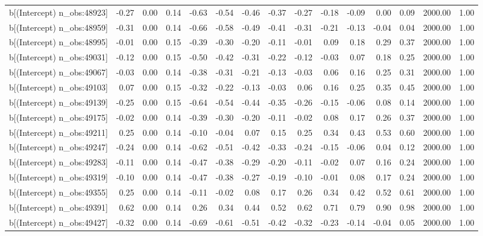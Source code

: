 \begin{table}[ht]
\begin{tabular}{rrrrrrrrrrrrrrr}
  b[(Intercept) n\_obs:48923] & -0.27 & 0.00 & 0.14 & -0.63 & -0.54 & -0.46 & -0.37 & -0.27 & -0.18 & -0.09 & 0.00 & 0.09 & 2000.00 & 1.00 \\ 
  b[(Intercept) n\_obs:48959] & -0.31 & 0.00 & 0.14 & -0.66 & -0.58 & -0.49 & -0.41 & -0.31 & -0.21 & -0.13 & -0.04 & 0.04 & 2000.00 & 1.00 \\ 
  b[(Intercept) n\_obs:48995] & -0.01 & 0.00 & 0.15 & -0.39 & -0.30 & -0.20 & -0.11 & -0.01 & 0.09 & 0.18 & 0.29 & 0.37 & 2000.00 & 1.00 \\ 
  b[(Intercept) n\_obs:49031] & -0.12 & 0.00 & 0.15 & -0.50 & -0.42 & -0.31 & -0.22 & -0.12 & -0.03 & 0.07 & 0.18 & 0.25 & 2000.00 & 1.00 \\ 
  b[(Intercept) n\_obs:49067] & -0.03 & 0.00 & 0.14 & -0.38 & -0.31 & -0.21 & -0.13 & -0.03 & 0.06 & 0.16 & 0.25 & 0.31 & 2000.00 & 1.00 \\ 
  b[(Intercept) n\_obs:49103] & 0.07 & 0.00 & 0.15 & -0.32 & -0.22 & -0.13 & -0.03 & 0.06 & 0.16 & 0.25 & 0.35 & 0.45 & 2000.00 & 1.00 \\ 
  b[(Intercept) n\_obs:49139] & -0.25 & 0.00 & 0.15 & -0.64 & -0.54 & -0.44 & -0.35 & -0.26 & -0.15 & -0.06 & 0.08 & 0.14 & 2000.00 & 1.00 \\ 
  b[(Intercept) n\_obs:49175] & -0.02 & 0.00 & 0.14 & -0.39 & -0.30 & -0.20 & -0.11 & -0.02 & 0.08 & 0.17 & 0.26 & 0.37 & 2000.00 & 1.00 \\ 
  b[(Intercept) n\_obs:49211] & 0.25 & 0.00 & 0.14 & -0.10 & -0.04 & 0.07 & 0.15 & 0.25 & 0.34 & 0.43 & 0.53 & 0.60 & 2000.00 & 1.00 \\ 
  b[(Intercept) n\_obs:49247] & -0.24 & 0.00 & 0.14 & -0.62 & -0.51 & -0.42 & -0.33 & -0.24 & -0.15 & -0.06 & 0.04 & 0.12 & 2000.00 & 1.00 \\ 
  b[(Intercept) n\_obs:49283] & -0.11 & 0.00 & 0.14 & -0.47 & -0.38 & -0.29 & -0.20 & -0.11 & -0.02 & 0.07 & 0.16 & 0.24 & 2000.00 & 1.00 \\ 
  b[(Intercept) n\_obs:49319] & -0.10 & 0.00 & 0.14 & -0.47 & -0.38 & -0.27 & -0.19 & -0.10 & -0.01 & 0.08 & 0.17 & 0.24 & 2000.00 & 1.00 \\ 
  b[(Intercept) n\_obs:49355] & 0.25 & 0.00 & 0.14 & -0.11 & -0.02 & 0.08 & 0.17 & 0.26 & 0.34 & 0.42 & 0.52 & 0.61 & 2000.00 & 1.00 \\ 
  b[(Intercept) n\_obs:49391] & 0.62 & 0.00 & 0.14 & 0.26 & 0.34 & 0.44 & 0.52 & 0.62 & 0.71 & 0.79 & 0.90 & 0.98 & 2000.00 & 1.00 \\ 
  b[(Intercept) n\_obs:49427] & -0.32 & 0.00 & 0.14 & -0.69 & -0.61 & -0.51 & -0.42 & -0.32 & -0.23 & -0.14 & -0.04 & 0.05 & 2000.00 & 1.00 \\ 

\end{tabular}
\end{table}
